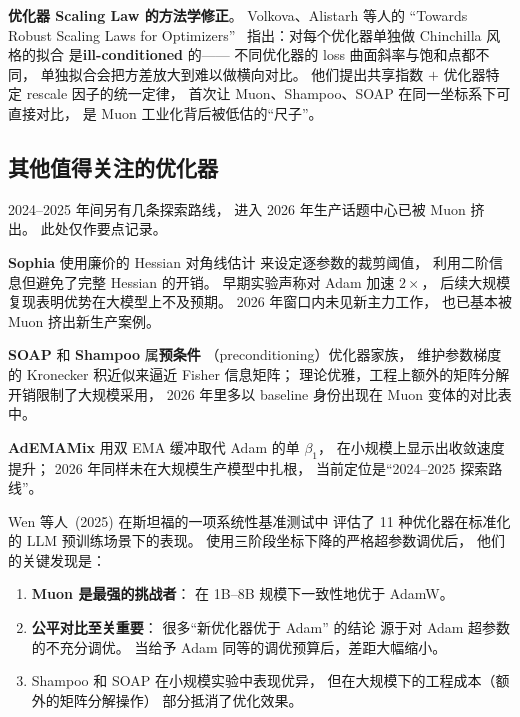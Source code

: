\textbf{优化器 Scaling Law 的方法学修正}。
Volkova、Alistarh 等人的
“Towards Robust Scaling Laws for Optimizers”~\cite{volkova2026robustopt}
指出：对每个优化器单独做 Chinchilla 风格的拟合
是\textbf{ill-conditioned} 的——
不同优化器的 loss 曲面斜率与饱和点都不同，
单独拟合会把方差放大到难以做横向对比。
他们提出共享指数 $+$ 优化器特定 rescale 因子的统一定律，
首次让 Muon、Shampoo、SOAP 在同一坐标系下可直接对比，
是 Muon 工业化背后被低估的“尺子”。

\subsection{其他值得关注的优化器}

2024--2025 年间另有几条探索路线，
进入 2026 年生产话题中心已被 Muon 挤出。
此处仅作要点记录。

\textbf{Sophia} 使用廉价的 Hessian 对角线估计
来设定逐参数的裁剪阈值，
利用二阶信息但避免了完整 Hessian 的开销。
早期实验声称对 Adam 加速 $2\times$，
后续大规模复现表明优势在大模型上不及预期。
2026 年窗口内未见新主力工作，
也已基本被 Muon 挤出新生产案例。

\textbf{SOAP} 和 \textbf{Shampoo} 属\textbf{预条件}
（preconditioning）优化器家族，
维护参数梯度的 Kronecker 积近似来逼近 Fisher 信息矩阵；
理论优雅，工程上额外的矩阵分解开销限制了大规模采用，
2026 年里多以 baseline 身份出现在 Muon 变体的对比表中。

\textbf{AdEMAMix} 用双 EMA 缓冲取代 Adam 的单 $\beta_1$，
在小规模上显示出收敛速度提升；
2026 年同样未在大规模生产模型中扎根，
当前定位是“2024--2025 探索路线”。

Wen 等人~(2025) 在斯坦福的一项系统性基准测试中%
评估了 11 种优化器在标准化的 LLM 预训练场景下的表现。
使用三阶段坐标下降的严格超参数调优后，
他们的关键发现是：
\begin{enumerate}[noitemsep]
  \item \textbf{Muon 是最强的挑战者}：
        在 1B--8B 规模下一致性地优于 AdamW。
  \item \textbf{公平对比至关重要}：
        很多“新优化器优于 Adam” 的结论
        源于对 Adam 超参数的不充分调优。
        当给予 Adam 同等的调优预算后，差距大幅缩小。
  \item Shampoo 和 SOAP 在小规模实验中表现优异，
        但在大规模下的工程成本（额外的矩阵分解操作）
        部分抵消了优化效果。
\end{enumerate}

